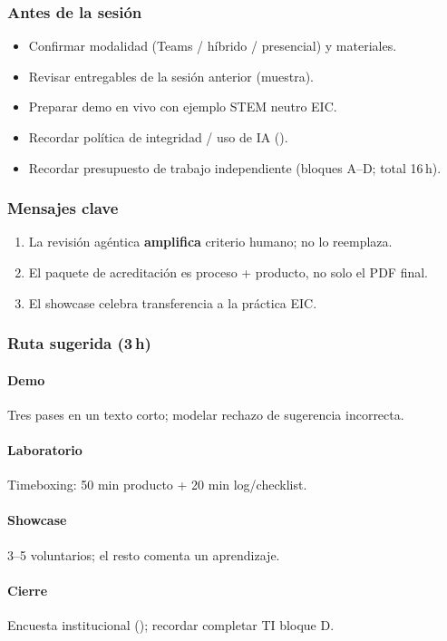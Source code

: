 \subsubsection*{Antes de la sesión}
\begin{itemize}
\item[$\square$] Confirmar modalidad (Teams / híbrido / presencial) y materiales.
\item[$\square$] Revisar entregables de la sesión anterior (muestra).
\item[$\square$] Preparar demo en vivo con ejemplo STEM neutro EIC.
\item[$\square$] Recordar política de integridad / uso de IA (\ceddie).
\item[$\square$] Recordar presupuesto de trabajo independiente (bloques A--D; total 16\,h).
\end{itemize}

\subsubsection*{Mensajes clave}
\begin{enumerate}
\item La revisión agéntica \textbf{amplifica} criterio humano; no lo reemplaza.
\item El paquete de acreditación es proceso + producto, no solo el PDF final.
\item El showcase celebra transferencia a la práctica EIC.
\end{enumerate}

\subsubsection*{Ruta sugerida (3\,h)}
\paragraph{Demo} Tres pases en un texto corto; modelar rechazo de sugerencia incorrecta.
\paragraph{Laboratorio} Timeboxing: 50 min producto + 20 min log/checklist.
\paragraph{Showcase} 3--5 voluntarios; el resto comenta un aprendizaje.
\paragraph{Cierre} Encuesta institucional (\ceddie); recordar completar TI bloque D.

